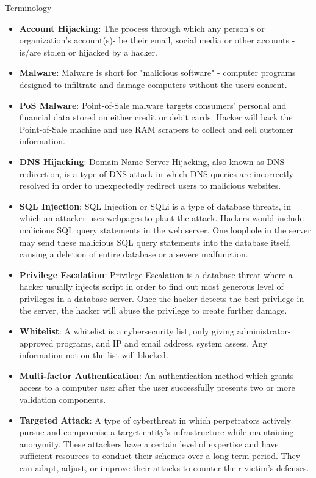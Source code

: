 \documentclass[final]{beamer}
\newlength{\colwidth}
\begin{document}
\begin{frame}[t]
\begin{columns}[t]
\begin{column}{\colwidth}
\begin{alertblock}{Terminology}
    \begin{itemize}
      \item \textbf{Account Hijacking}: The process through which any person's or organization's account(s)- be their email, social media or other accounts - is/are stolen or hijacked by a hacker. 
      \item \textbf{Malware}: Malware is short for "malicious software" - computer programs designed to infiltrate and damage computers without the users consent. 
      \item \textbf{PoS Malware}: Point-of-Sale malware targets consumers' personal and financial data stored on either credit or debit cards. Hacker will hack the Point-of-Sale machine and use RAM scrapers to collect and sell customer information. 
      \item \textbf{DNS Hijacking}: Domain Name Server Hijacking, also known as DNS redirection, is a type of DNS attack in which DNS queries are incorrectly resolved in order to unexpectedly redirect users to malicious websites. 
      \item \textbf{SQL Injection}: SQL Injection or SQLi is a type of database threats, in which an attacker uses webpages to plant the attack. Hackers would include malicious SQL query statements in the web server. One loophole in the server may send these malicious SQL query statements into the database itself, causing a deletion of entire database or a severe malfunction. 
      \item \textbf{Privilege Escalation}: Privilege Escalation is a database threat where a hacker usually injects script in order to find out most generous level of privileges in a database server. Once the hacker detects the best privilege in the server, the hacker will abuse the privilege to create further damage. 
      \item \textbf{Whitelist}: A whitelist is a cybersecurity list, only giving administrator-approved programs, and IP and email address, system assess. Any information not on the list will blocked. 
      \item \textbf{Multi-factor Authentication}: An authentication method which grants access to a computer user after the user successfully presents two or more validation components. 
      \item \textbf{Targeted Attack}: A type of cyberthreat in which perpetrators actively pursue and compromise a target entity's infrastructure while maintaining anonymity. These attackers have a certain level of expertise and have sufficient resources to conduct their schemes over a long-term period. They can adapt, adjust, or improve their attacks to counter their victim's defenses. 

\end{itemize}
\end{alertblock}
\end{column}
\end{columns}
\end{frame}
\end{document}
